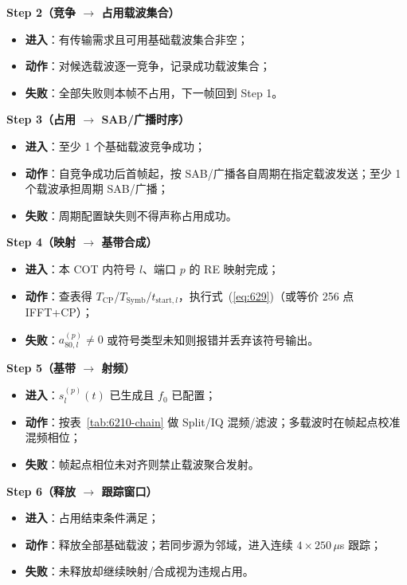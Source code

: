 \documentclass[11pt,a4paper]{ctexart}
\begin{document}
\textbf{Step 2（竞争 $\rightarrow$ 占用载波集合）}
\begin{itemize}[nosep]
  \item \textbf{进入}：有传输需求且可用基础载波集合非空；
  \item \textbf{动作}：对候选载波逐一竞争，记录成功载波集合；
  \item \textbf{失败}：全部失败则本帧不占用，下一帧回到 Step 1。
\end{itemize}

\textbf{Step 3（占用 $\rightarrow$ SAB/广播时序）}
\begin{itemize}[nosep]
  \item \textbf{进入}：至少 1 个基础载波竞争成功；
  \item \textbf{动作}：自竞争成功后首帧起，按 SAB/广播各自周期在指定载波发送；至少 1 个载波承担周期 SAB/广播；
  \item \textbf{失败}：周期配置缺失则不得声称占用成功。
\end{itemize}

\textbf{Step 4（映射 $\rightarrow$ 基带合成）}
\begin{itemize}[nosep]
  \item \textbf{进入}：本 COT 内符号 $l$、端口 $p$ 的 RE 映射完成；
  \item \textbf{动作}：查表得 $T_{\mathrm{CP}}$/$T_{\mathrm{Symb}}$/$t_{\mathrm{start},l}$，执行式~(\ref{eq:629})（或等价 256 点 IFFT+CP）；
  \item \textbf{失败}：$a_{80,l}^{(p)}{\neq}0$ 或符号类型未知则报错并丢弃该符号输出。
\end{itemize}

\textbf{Step 5（基带 $\rightarrow$ 射频）}
\begin{itemize}[nosep]
  \item \textbf{进入}：$s_l^{(p)}(t)$ 已生成且 $f_0$ 已配置；
  \item \textbf{动作}：按表~\ref{tab:6210-chain} 做 Split/IQ 混频/滤波；多载波时在帧起点校准混频相位；
  \item \textbf{失败}：帧起点相位未对齐则禁止载波聚合发射。
\end{itemize}

\textbf{Step 6（释放 $\rightarrow$ 跟踪窗口）}
\begin{itemize}[nosep]
  \item \textbf{进入}：占用结束条件满足；
  \item \textbf{动作}：释放全部基础载波；若同步源为邻域，进入连续 $4\times 250$\,$\mu$s 跟踪；
  \item \textbf{失败}：未释放却继续映射/合成视为违规占用。
\end{itemize}
\end{document}
